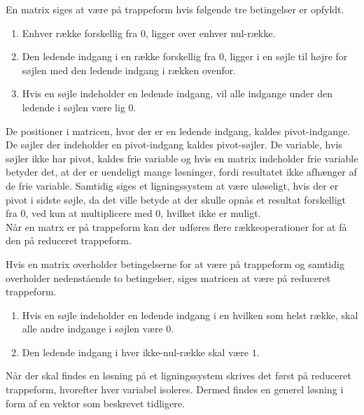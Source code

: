 \begin{defn}[Trappeform]
En matrix siges at være på trappeform hvis følgende tre betingelser er opfyldt. 
\begin{enumerate}
\item Enhver række forskellig fra 0, ligger over enhver nul-række.
\item Den ledende indgang i en række forskellig fra 0, ligger i en søjle til højre for søjlen med den ledende indgang i rækken ovenfor.
\item Hvis en søjle indeholder en ledende indgang, vil alle indgange under den ledende i søjlen være lig 0.
\end{enumerate}
\label{defn_trappe}
\end{defn}

De positioner i matricen, hvor der er en ledende indgang, kaldes pivot-indgange. De søjler der indeholder en pivot-indgang kaldes pivot-søjler. De variable, hvis søjler ikke har pivot, kaldes frie variable og hvis en matrix indeholder frie variable betyder det, at der er uendeligt mange løsninger, fordi resultatet ikke afhænger af de frie variable. Samtidig siges et ligningssystem at være uløseligt, hvis der er pivot i sidste søjle, da det ville betyde at der skulle opnås et resultat forskelligt fra 0, ved kun at multiplicere med 0, hvilket ikke er muligt.\\
Når en matrx er på trappeform kan der udføres flere rækkeoperationer for at få den på reduceret trappeform.

\begin{defn}
Hvis en matrix overholder betingelserne for at være på trappeform og samtidig overholder nedenstående to betingelser, siges matricen at være på reduceret trappeform.
\begin{enumerate}
\item Hvis en søjle indeholder en ledende indgang i en hvilken som helst række, skal alle andre indgange i søjlen være $0$.
\item Den ledende indgang i hver ikke-nul-række skal være $1$.
\end{enumerate}
\end{defn}

Når der skal findes en løsning på et ligningssystem skrives det først på reduceret trappeform, hvorefter hver variabel isoleres. 
Dermed findes en generel løsning i form af en vektor som beskrevet tidligere. %

